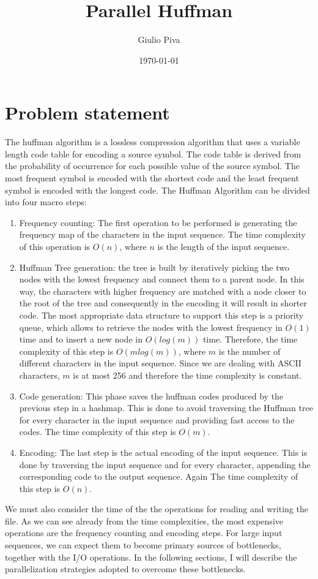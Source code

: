 \documentclass{article}
\title{Parallel Huffman}
\author{Giulio Piva}
\date{\today}
\begin{document}
\maketitle

\tableofcontents
\break
\section{Problem statement}
The huffman algorithm is a lossless compression algorithm that uses a variable length code table
for encoding a source symbol. The code table is derived from the probability of occurrence for each
possible value of the source symbol. The most frequent symbol is encoded with the shortest code
and the least frequent symbol is encoded with the longest code.
The Huffman Algorithm can be divided into four macro steps:
\begin{enumerate}
    \item Frequency counting: The first operation to be performed is generating the frequency map of the characters in the input sequence.
          The time complexity of this operation is $O(n)$, where $n$ is the length of the input sequence.
    \item Huffman Tree generation: the tree is built by iteratively picking the two nodes with the lowest frequency and connect them to a parent node.
          In this way, the characters with higher frequency are matched with a node closer to the root of the tree and consequently
          in the encoding it will result in shorter code. The most appropriate data structure to
          support this step is a priority queue, which allows to retrieve the nodes with the lowest frequency in $O(1)$ time and to insert a new node in $O(log(m))$ time.
          Therefore, the time complexity of this step is $O(mlog(m))$, where $m$ is the number of different characters in the input sequence. Since
          we are dealing with ASCII characters, $m$ is at most 256 and therefore the time complexity is constant.
    \item Code generation: This phase saves the huffman codes produced by the previous step in a hashmap. This
          is done to avoid traversing the Huffman tree for every character in the input sequence and providing fast access to the codes.
          The time complexity of this step is $O(m)$.
    \item Encoding: The last step is the actual encoding of the input sequence. This is done by traversing the input sequence and
          for every character, appending the corresponding code to the output sequence. Again The time complexity of this step is $O(n)$.
\end{enumerate}
We must also consider the time of the the operations for reading and writing the file.
As we can see already from the time complexities, the most expensive operations are the frequency counting and encoding steps.
For large input sequences, we can expect them to become primary sources of bottlenecks, together with the I/O operations.
In the following sections, I will describe the parallelization strategies adopted to overcome these bottlenecks.
\end{document}
